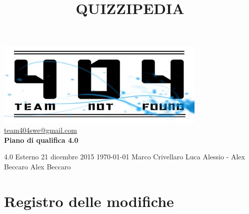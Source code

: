 \documentclass[a4paper,11pt]{article}
\title{\textbf{{\fontsize{8mm}{5mm}\selectfont QUIZZIPEDIA}}}
\date{}
\author{}
\begin{document}
	\maketitle
	\thispagestyle{empty}
	\begin{center}	
	\includegraphics{../../team_not_found}
	\fontsize{5mm}{3mm}\url{team404swe@gmail.com}\\
	
	\vspace{50mm}
	\textbf{Piano di qualifica 4.0}
	\end{center}
			{4.0} 							%
			{Esterno} 						%
			{21 dicembre 2015} 				%
			{\today} 						%
			{Marco Crivellaro}	%
			{Luca Alessio - Alex Beccaro} 	%
			{Alex Beccaro} 			%
	\newpage
	\thispagestyle{empty}
	\null  %

	\newpage
	\newpage
	\fancyfoot[R]{\thepage}
	
	\hspace{30 mm}
	\section*{Registro delle modifiche}
	
\end{document}
